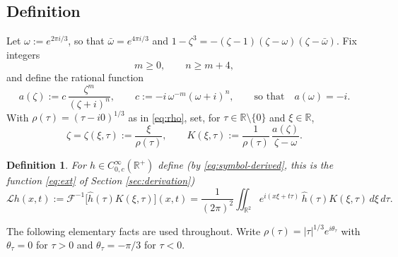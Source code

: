 \documentclass[10pt,reqno]{amsart}
\newtheorem{definition}[theorem]{Definition}
\theoremstyle{remark}
\numberwithin{equation}{section}
\newcommand{\R}{\mathbb R}
\newcommand{\om}{\omega}
\newcommand{\Lc}{\mathcal{L}}
\newcommand{\F}{\mathcal{F}}
\begin{document}
\subsection{Definition}
Let $\om:=e^{2\pi i/3}$, so that $\bar\om=e^{4\pi i/3}$ and $1-\zeta^3=-(\zeta-1)(\zeta-\om)(\zeta-\bar\om)$. Fix integers
\begin{equation}\label{eq:mn}
m\ge0,\qquad n\ge m+4,
\end{equation}
and define the rational function
\begin{equation}\label{eq:a}
a(\zeta):=c\,\frac{\zeta^m}{(\zeta+i)^n},\qquad c:=-i\,\om^{-m}(\om+i)^n,\qquad\text{so that}\quad a(\om)=-i .
\end{equation}
With $\rho(\tau)=(\tau-i0)^{1/3}$ as in \eqref{eq:rho}, set, for $\tau\in\R\setminus\{0\}$ and $\xi\in\R$,
\begin{equation}\label{eq:K}
\zeta=\zeta(\xi,\tau):=\frac{\xi}{\rho(\tau)},\qquad K(\xi,\tau):=\frac{1}{\rho(\tau)}\,\frac{a(\zeta)}{\zeta-\om}.
\end{equation}

\begin{definition}\label{def:L}
For $h\in C^\infty_{0,c}(\R^+)$ define (by \eqref{eq:symbol-derived}, this is the function \eqref{eq:ext} of Section \ref{sec:derivation})
\begin{equation}\label{eq:Ldef}
\Lc h(x,t):=\F^{-1}\big[\widehat h(\tau)K(\xi,\tau)\big](x,t)=\frac{1}{(2\pi)^2}\iint_{\R^2}e^{i(x\xi+t\tau)}\,\widehat h(\tau)K(\xi,\tau)\,d\xi\,d\tau .
\end{equation}
\end{definition}

The following elementary facts are used throughout. Write $\rho(\tau)=|\tau|^{1/3}e^{i\theta_\tau}$ with $\theta_\tau=0$ for $\tau>0$ and $\theta_\tau=-\pi/3$ for $\tau<0$.
\end{document}
